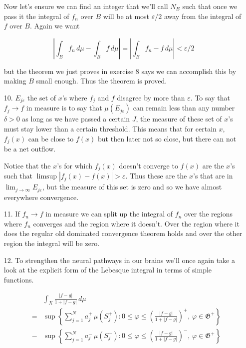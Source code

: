 \documentclass[oneside]{book}
\begin{document}
\begin{enumerate}
Now let's ensure we can find an integer that we'll call $N_{B}$ such that once we pass it the integral of $f_n$ over $B$ will be at most $\varepsilon/2$ away from the integral of $f$ over $B$. Again we want 

\begin{equation}
\left| \int_{B} f_n\, d\mu - \int_{B} f\,d\mu \right| = \left| \int_{B} f_n-f\,d\mu \right| < \varepsilon /2
\end{equation}

but the theorem we just proves in exercise 8 says we can accomplish this by making $B$ small enough. Thus the theorem is proved. 

\item[10.] $E_{j\varepsilon}$ the set of $x$'s where $f_j$ and $f$ disagree by more than $\varepsilon$. To say that $f_j \to f$ in measure is to say that $\mu(E_{j\varepsilon})$ can remain less than any number $\delta > 0$ as long as we have passed a certain $J$, the measure of these set of $x$'s must stay lower than a certain threshold. This means that for certain $x$, $f_j(x)$ can be close to $f(x)$ but then later not so close, but there can not be a net outflow.

Notice that the $x$'s for which $f_j(x)$ doesn't converge to $f(x)$ are the $x$'s such that $\limsup |f_j(x)-f(x)| > \varepsilon$. Thus these are the $x$'s that are in $\lim_{j \to \infty} E_{j \varepsilon}$, but the measure of this set is zero and so we have almost everywhere convergence. 

\item[11.] If $f_n \to f$ in measure we can split up the integral of $f_n$ over the regions where $f_n$ converges and the region where it doesn't. Over the region where it does the regular old dominated convergence theorem holds and over the other region the integral will be zero.

\item[12.] To strengthen the neural pathways in our brains we'll once again take a look at the explicit form of the Lebesque integral in terms of simple functions.

\begin{eqnarray}
&&\int_X \frac{|f-g|}{1+|f-g|}\, d\mu \nonumber\\
&=& \sup \left\{ \sum_{j=1}^N a_j^+\, \mu(S_j^+): 0 \le \varphi \le \left( \frac{|f-g|}{1+|f-g|}\right)^+,\, \varphi \in \mathfrak{G}^+ \right\}\nonumber\\
&-& \sup \left\{ \sum_{j=1}^N a_j^-\, \mu(S_j^-): 0 \le \varphi \le \left( \frac{|f-g|}{1+|f-g|} \right)^-,\, \varphi \in \mathfrak{G}^+ \right\}\nonumber\\
\end{eqnarray}


\end{enumerate}
\end{document}
